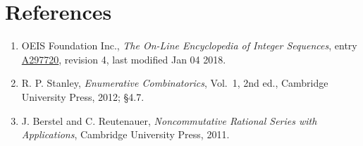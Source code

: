 \documentclass[11pt]{article}
\theoremstyle{definition}
\begin{document}
\section{References}

\begin{enumerate}

\item OEIS Foundation Inc., \emph{The On-Line Encyclopedia of Integer Sequences}, entry \href{https://oeis.org/A297720}{A297720}, revision 4, last modified Jan 04 2018.

\item R. P. Stanley, \emph{Enumerative Combinatorics}, Vol.~1, 2nd ed., Cambridge University Press, 2012; \S4.7.

\item J. Berstel and C. Reutenauer, \emph{Noncommutative Rational Series with Applications}, Cambridge University Press, 2011.

\end{enumerate}
\end{document}
